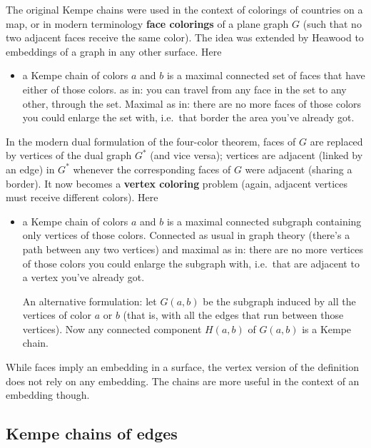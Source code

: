 \documentclass[12pt]{article}
\begin{document}
The original Kempe chains were used in the context of colorings of countries
on a map, or in modern terminology {\bf face colorings} of a plane graph $G$
(such that no two adjacent faces receive the same color). The idea was
extended by Heawood to embeddings of a graph in any other surface. Here
%
\begin{itemize}

\item a Kempe chain of colors $a$ and $b$ is a maximal connected set of faces
that have either of those colors.  as in: you can travel from any face in the set to any other, through the set. Maximal as in: there are no more faces of those colors you could enlarge the set with, i.e.\ that border the area you've already got.

\end{itemize}
%
In the modern dual formulation of the four-color theorem, faces of $G$ are
replaced by vertices of the dual graph $G^*$ (and vice versa); vertices are
adjacent (linked by an edge) in $G^*$ whenever the corresponding faces of $G$
were adjacent (sharing a border). It now becomes a {\bf vertex coloring}
problem (again, adjacent vertices must receive different colors). Here
%
\begin{itemize}

\item a Kempe chain of colors $a$ and $b$ is a maximal connected subgraph
containing only vertices of those colors. Connected as usual in graph theory
(there's a path between any two vertices) and maximal as in: there are no
more vertices of those colors you could enlarge the subgraph with, i.e.\ that
are adjacent to a vertex you've already got.

An alternative formulation: let $G(a,b)$ be the subgraph induced by all the
vertices of color $a$ or $b$ (that is, with all the edges that run between
those vertices). Now any connected component $H(a,b)$ of $G(a,b)$ is a Kempe
chain.

\end{itemize}
%
While faces imply an embedding in a surface, the vertex version of the
definition does not rely on any embedding. The chains are more useful in
the context of an embedding though.

\clearpage
\subsection*{Kempe chains of edges}
\end{document}
